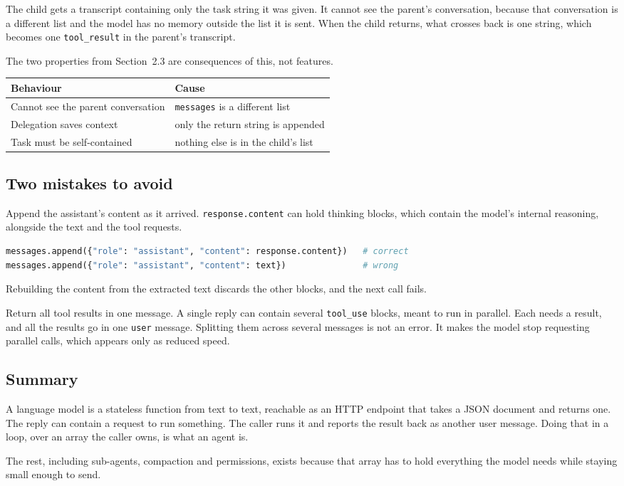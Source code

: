 \documentclass[11pt]{article}
\newcommand{\code}[1]{\texttt{#1}}
\begin{document}
The child gets a transcript containing only the task string it was given. It
cannot see the parent's conversation, because that conversation is a different
list and the model has no memory outside the list it is sent. When the child
returns, what crosses back is one string, which becomes one \code{tool\_result}
in the parent's transcript.

The two properties from Section~2.3 are consequences of this, not features.

\begin{center}
\begin{tabular}{@{}ll@{}}
\toprule
Behaviour & Cause \\
\midrule
Cannot see the parent conversation & \code{messages} is a different list \\
Delegation saves context           & only the return string is appended \\
Task must be self-contained        & nothing else is in the child's list \\
\bottomrule
\end{tabular}
\end{center}

\subsection{Two mistakes to avoid}

Append the assistant's content as it arrived. \code{response.content} can hold
thinking blocks, which contain the model's internal reasoning, alongside the text
and the tool requests.

\begin{lstlisting}[language=Python]
messages.append({"role": "assistant", "content": response.content})   # correct
messages.append({"role": "assistant", "content": text})               # wrong
\end{lstlisting}

Rebuilding the content from the extracted text discards the other blocks, and the
next call fails.

Return all tool results in one message. A single reply can contain several
\code{tool\_use} blocks, meant to run in parallel. Each needs a result, and all
the results go in one \code{user} message. Splitting them across several messages
is not an error. It makes the model stop requesting parallel calls, which appears
only as reduced speed.

\subsection{Summary}

A language model is a stateless function from text to text, reachable as an HTTP
endpoint that takes a JSON document and returns one. The reply can contain a
request to run something. The caller runs it and reports the result back as
another user message. Doing that in a loop, over an array the caller owns, is
what an agent is.

The rest, including sub-agents, compaction and permissions, exists because that
array has to hold everything the model needs while staying small enough to send.
\end{document}
